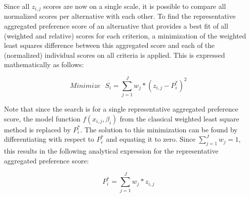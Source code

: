\documentclass[a4paper]{article}
\begin{document}
Since all $z_{i,j}$ scores are now on a single scale, it is possible to compare all normalized scores per alternative with each other. To find the representative aggregated preference score of an alternative that provides a best fit of all (weighted and relative) scores for each criterion, a minimization of the weighted least squares difference between this aggregated score and each of the (normalized) individual scores on all criteria is applied. This is expressed mathematically as follows:

\begin{equation}
     \textit{Minimize} \text{\ }S_i = \sum_{j=1}^{J} w_j * (z_{i,j} - P_i^*)^2
\end{equation}

Note that since the search is for a single representative aggregated preference score, the model function $f(x_{i,j}, \beta_i)$ from the classical weighted least square method is replaced by $P_i^*$. The solution to this minimization can be found by differentiating with respect to $P_i^*$ and equating it to zero. Since $\sum_{j=1}^{J}w_j=1$, this results in the following analytical expression for the representative aggregated preference score:

\begin{equation}
    P_i^* = \sum_{j=1}^{J} w_j * z_{i,j}
\end{equation}
\end{document}
